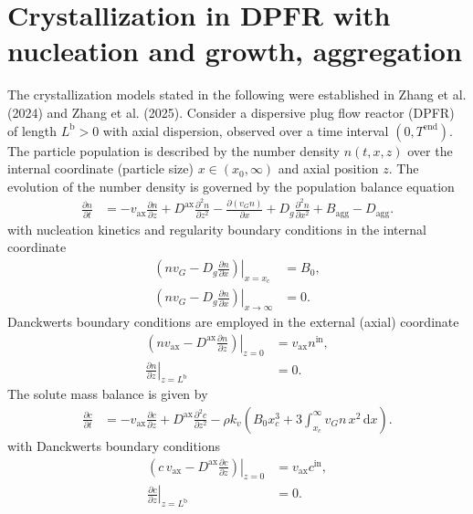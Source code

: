 \documentclass{article}
\begin{document}
\section*{Crystallization in DPFR with nucleation and growth, aggregation}
The crystallization models stated in the following were established in Zhang et al. (2024) and Zhang et al. (2025).
Consider a dispersive plug flow reactor (DPFR) of length $L^{\mathrm{b}} > 0$ with axial dispersion, observed over a time interval $(0, T^{\mathrm{end}})$.
The particle population is described by the number density $n(t, x, z)$ over the internal coordinate (particle size) $x\in(x_{0}, \infty)$ and axial position $z$.
The evolution of the number density is governed by the population balance equation
\begin{align}
    \frac{\partial n}{\partial t}
    &= - v_{\mathrm{ax}} \frac{\partial n}{\partial z}
        + D^{\mathrm{ax}} \frac{\partial^{2} n}{\partial z^{2}}
        - \frac{\partial (v_{G} n)}{\partial x}
        + D_{g} \frac{\partial^{2} n}{\partial x^{2}}
        + B_{\mathrm{agg}}
        - D_{\mathrm{agg}}.
\end{align}
with nucleation kinetics and regularity boundary conditions in the internal coordinate
\begin{align}
    \left. \left( n v_{G} - D_{g} \frac{\partial n}{\partial x} \right) \right|_{x = x_{c}}
    &= B_{0},
    \\
    \left. \left( n v_{G} - D_{g} \frac{\partial n}{\partial x} \right) \right|_{x \to \infty}
    &= 0.
\end{align}
Danckwerts boundary conditions are employed in the external (axial) coordinate
\begin{align}
    \left. \left( n v_{\mathrm{ax}} - D^{\mathrm{ax}} \frac{\partial n}{\partial z} \right) \right|_{z=0}
    &= v_{\mathrm{ax}} n^{\mathrm{in}},
    \\
    \left. \frac{\partial n}{\partial z} \right|_{z=L^{\mathrm{b}}}
    &= 0.
\end{align}
The solute mass balance is given by
\begin{align}
    \frac{\partial c}{\partial t}
    &= - v_{\mathrm{ax}} \frac{\partial c}{\partial z}
        + D^{\mathrm{ax}} \frac{\partial^{2} c}{\partial z^{2}}
        - \rho k_{v} \left( B_{0} x_{c}^{3} + 3 \int_{x_{c}}^{\infty} v_{G} n \, x^{2} \, \mathrm{d}x \right).
\end{align}
with Danckwerts boundary conditions
\begin{align}
    \left. \left( c \, v_{\mathrm{ax}} - D^{\mathrm{ax}} \frac{\partial c}{\partial z} \right) \right|_{z=0}
    &= v_{\mathrm{ax}} c^{\mathrm{in}},
    \\
    \left. \frac{\partial c}{\partial z} \right|_{z=L^{\mathrm{b}}}
    &= 0.
\end{align}
\end{document}
